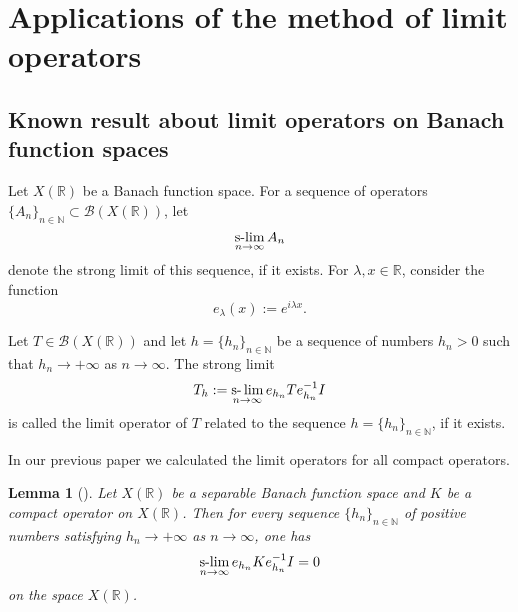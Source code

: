 \documentclass{birkjour}
\newtheorem{lemma}[theorem]{Lemma}
\numberwithin{equation}{section}
\newcommand{\N}{\mathbb{N}}
\newcommand{\R}{\mathbb{R}}
\newcommand{\cB}{\mathcal{B}}
\newcommand{\slim}{\operatornamewithlimits{s-\!\lim}_{n\to\infty}}
\begin{document}
\section{Applications of the method of limit operators}
\label{sec:proofs}
\subsection{Known {result} about limit operators on Banach
function spaces}
Let $X(\R)$ be a Banach function space. For a sequence of operators
$\{A_n\}_{n\in\N}\subset\cB(X(\R))$, let
\[
\slim A_n
\]
denote the strong limit of this sequence, if it exists.
For $\lambda,x\in\R$, consider the function
\[
e_\lambda(x):=e^{i\lambda x}.
\]


Let $T\in\cB(X(\R))$ and let $h=\{h_n\}_{n\in\N}$ be a sequence of numbers
$h_n>0$ such that $h_n\to +\infty$ as $n\to\infty$. The strong limit
\[
T_{h}:=\operatornamewithlimits{s-\lim}_{n\to\infty}
e_{h_n}Te_{h_n}^{-1}I
\]
is called the limit operator of $T$ related to the sequence
$h=\{h_n\}_{n\in\N}$, if it exists.

{
In our previous paper \cite{FKK-FS12} we calculated the limit
operators for all compact operators.
}
\begin{lemma}[{\cite[Lemma~3.2]{FKK-FS12}}]
\label{le:LO-compact}
Let $X(\R)$ be a separable Banach function space and $K$ be a compact operator
on $X(\R)$. Then for every sequence $\{h_n\}_{n\in\N}$ of positive numbers
satisfying $h_n\to+\infty$ as $n\to\infty$, one has
\[
\slim e_{h_n}Ke_{h_n}^{-1}I=0
\]
on the space $X(\R)$.
\end{lemma}
\end{document}

